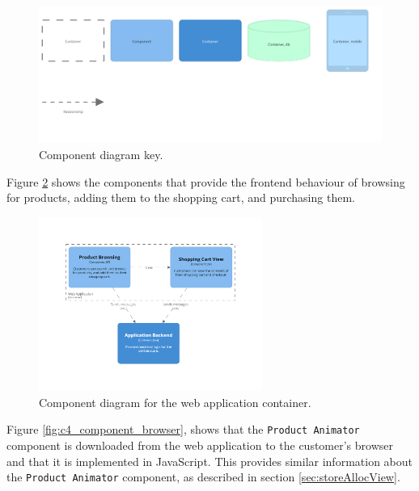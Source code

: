 \begin{figure}[h!]
    \centering
    \begin{adjustwidth}{-7.5mm}{-7.5mm}
        \includegraphics[trim=15 210 90 20,clip,width=0.95\paperwidth]{images/c4/component_diagram-key.png}
    \end{adjustwidth}
    \caption{Component diagram key.}
    \label{fig:c4_component_key}
\end{figure}

\newpage
\noindent
Figure \ref{fig:c4_component_webapp} shows the components that provide the frontend behaviour
of browsing for products, adding them to the shopping cart, and purchasing them.

\begin{figure}[h!]
    \centering
    \includegraphics[trim=190 193 190 195,clip,width=0.65\textwidth]{images/c4/webapp_component_diagram.png}
    \caption{Component diagram for the web application container.}
    \label{fig:c4_component_webapp}
\end{figure}

\noindent
Figure \ref{fig:c4_component_browser}, shows that the \texttt{Product Animator} component
is downloaded from the web application to the customer's browser and that it is implemented in JavaScript.
This provides similar information about the \texttt{Product Animator} component, as described in section \ref{sec:storeAllocView}.

